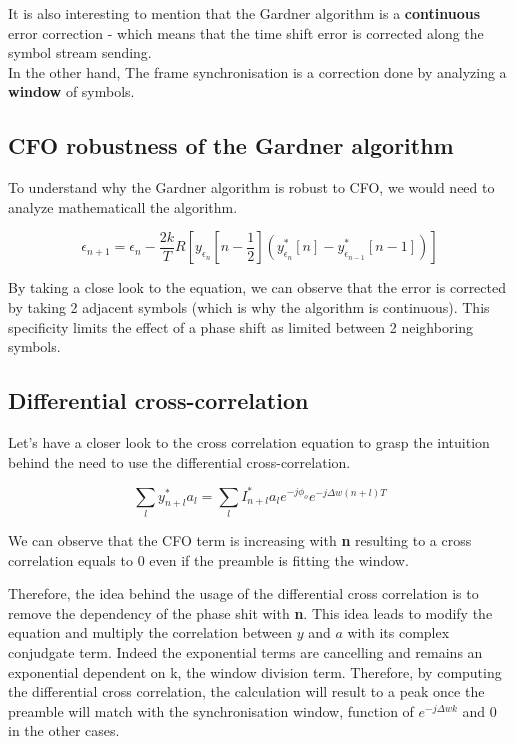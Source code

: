 It is also interesting to mention that the Gardner algorithm is a \textbf{continuous} error correction - which means that
the time shift error is corrected along the symbol stream sending.\\
In the other hand, The frame synchronisation is a correction done by analyzing a \textbf{window} of symbols.

\subsection{CFO robustness of the Gardner algorithm}

To understand why the Gardner algorithm is robust to CFO, we would need to analyze mathematicall the algorithm.

\begin{equation*}
    \epsilon_{n+1} = \epsilon_{n} - \frac{2k}{T} R[y_{\epsilon_{n}}[n-\frac{1}{2}](y_{\epsilon_{n}}^{*}[n] - y_{\epsilon_{n-1}}^{*}[n-1])]
\end{equation*}

By taking a close look to the equation, we can observe that the error is corrected by taking 2 adjacent symbols (which is why the algorithm is
continuous). This specificity limits the effect of a phase shift as limited between 2 neighboring symbols.

\subsection{Differential cross-correlation}

Let's have a closer look to the cross correlation equation to grasp the intuition behind the need to use the differential cross-correlation.

\begin{equation*}
    \sum_{l}{y^{*}_{n+l}a_{l}} = \sum_{l}{I^{*}_{n+l}a_{l}e^{-j\phi_{o}}e^{-j\Delta w(n+l)T}}
\end{equation*}

We can observe that the CFO term is increasing with \textbf{n} resulting to a cross correlation equals to 0 even if the preamble is fitting
the window.

Therefore, the idea behind the usage of the differential cross correlation is to remove the dependency of the phase shit with \textbf{n}.
This idea leads to modify the equation and multiply the correlation between $y$ and $a$ with its complex conjudgate term. Indeed the exponential 
terms are cancelling and remains an exponential dependent on k, the window division term.
Therefore, by computing the differential cross correlation, the calculation will result to a peak once the preamble will match with the synchronisation
 window, function of $e^{-j\Delta wk}$ and 0 in the other cases.
 
